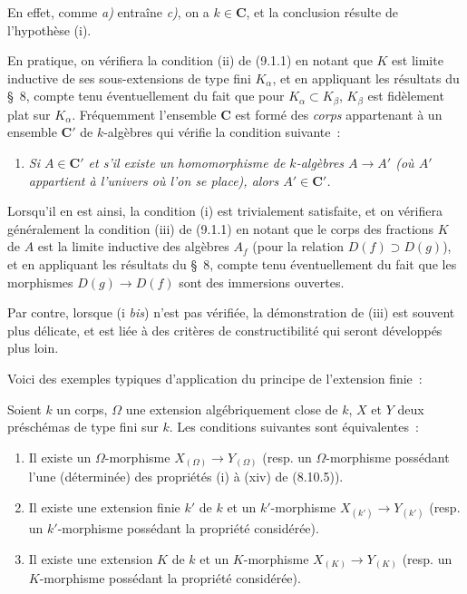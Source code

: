 En effet, comme \emph{a)} entraîne \emph{c)}, on a $k\in\boldsymbol{C}$, et la
conclusion résulte de l'hypothèse (i).

\begin{remark}[9.1.3]
\label{IV.9.1.3-fr}
En pratique, on vérifiera la condition (ii) de (9.1.1) en notant que $K$ est
limite inductive de ses sous-extensions de type fini $K_\alpha$, et en
appliquant les résultats du \S~8, compte tenu éventuellement du fait que pour
$K_\alpha\subset K_\beta$, $K_\beta$ est fidèlement plat sur $K_\alpha$.
Fréquemment l'ensemble $\boldsymbol{C}$ est formé des \emph{corps} appartenant à
un ensemble $\boldsymbol{C}'$ de $k$-algèbres qui vérifie la condition suivante~:
\begin{enumerate}[label=(i \emph{bis})]
  \item \itshape Si $A\in\boldsymbol{C}'$ et s'il existe un homomorphisme de $k$-algèbres
  $A\to A'$ (où $A'$ appartient à l'univers où l'on se place), alors
  $A'\in\boldsymbol{C}'$.
\end{enumerate}

Lorsqu'il en est ainsi, la condition (i) est trivialement satisfaite, et on
vérifiera généralement la condition (iii) de (9.1.1) en notant que le corps
des fractions $K$ de $A$ est la limite inductive des algèbres $A_f$ (pour la
relation $D(f)\supset D(g)$), et en appliquant les résultats du \S~8, compte
tenu éventuellement du fait que les morphismes $D(g)\to D(f)$ sont des
immersions ouvertes.

Par contre, lorsque (i \emph{bis}) n'est pas vérifiée, la démonstration de (iii) est
souvent plus délicate, et est liée à des critères de constructibilité qui
seront développés plus loin.
\end{remark}

Voici des exemples typiques d'application du principe de l'extension finie~:

\begin{proposition}[9.1.4]
\label{IV.9.1.4-fr}
Soient $k$ un corps, $\Omega$ une extension algébriquement close de $k$,
$X$ et $Y$ deux préschémas de type fini sur $k$. Les conditions suivantes
sont équivalentes~:
\begin{enumerate}[label=\emph{\alph*)}]
  \item Il existe un $\Omega$-morphisme $X_{(\Omega)}\to Y_{(\Omega)}$
  (\textup{resp.} un $\Omega$-morphisme possédant l'une (déterminée) des propriétés
  \textup{(i)} à \textup{(xiv)} de \textup{(8.10.5)}).
  \item Il existe une extension finie $k'$ de $k$ et un $k'$-morphisme
  $X_{(k')}\to Y_{(k')}$ (\textup{resp.} un $k'$-morphisme possédant la propriété
  considérée).
  \item Il existe une extension $K$ de $k$ et un $K$-morphisme
  $X_{(K)}\to Y_{(K)}$ (\textup{resp.} un $K$-morphisme possédant la propriété
  considérée).
\end{enumerate}
\end{proposition}

